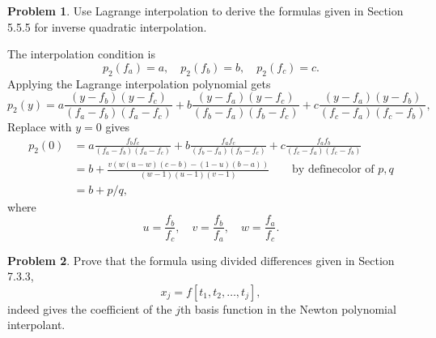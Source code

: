 \documentclass[a4paper]{book}
\makeatletter
\newenvironment{sol}[1][\solname]{\par
  \pushQED{\qed}
  \normalfont \topsep6\p@\@plus6\p@\relax
  \trivlist
  \item[\hskip\labelsep
        \itshape
    #1\@addpunct{.}]\ignorespaces
}{\popQED\endtrivlist\@endpefalse}
\providecommand{\solname}{Solution}
\numberwithin{equation}{chapter}
\theoremstyle{definition}
\newtheorem{pro}{Problem}
\makeatother
\begin{document}
  \begin{pro}
    Use Lagrange interpolation to derive the formulas given in
    Section 5.5.5 for inverse quadratic interpolation.
  \end{pro}
  
  \begin{sol}
    The interpolation condition is
    \begin{displaymath}
      p_2(f_a) = a, \quad p_2(f_b) = b, \quad p_2(f_c) = c.
    \end{displaymath}
    Applying the Lagrange interpolation polynomial gets
    \begin{displaymath}
      p_2(y) = a \frac{(y-f_b)(y-f_c)}{(f_a-f_b)(f_a-f_c)}
      + b \frac{(y-f_a)(y-f_c)}{(f_b-f_a)(f_b-f_c)}
      + c \frac{(y-f_a)(y-f_b)}{(f_c-f_a)(f_c-f_b)},
    \end{displaymath}
    Replace with $y=0$ gives
    \begin{align*}
      p_2(0) &= a \frac{f_bf_c}{(f_a-f_b)(f_a-f_c)}
      + b \frac{f_af_c}{(f_b-f_a)(f_b-f_c)}
               + c \frac{f_af_b}{(f_c-f_a)(f_c-f_b)} \\
      &= b + \frac{v(w(u-w)(c-b) - (1-u)(b-a))}{(w-1)(u-1)(v-1)} \qquad \text{by definecolor of } p,q\\ 
      &= b + p/q,
    \end{align*}
    where
    \begin{displaymath}
      u = \frac{f_b}{f_c}, \quad v = \frac{f_b}{f_a}, \quad
      w = \frac{f_a}{f_c}.
    \end{displaymath}
  \end{sol}

  \begin{pro}
    Prove that the formula using divided differences given in Section
    7.3.3,
    \begin{displaymath}
      x_j = f[t_1, t_2, \ldots, t_j],
    \end{displaymath}
    indeed gives the coefficient of the $j$th basis function
    in the Newton polynomial interpolant.
  \end{pro}
  
\end{document}
